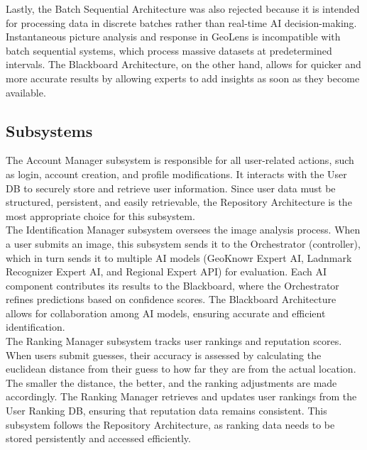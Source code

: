 \documentclass[]{article}
\begin{document}
\noindent Lastly, the Batch Sequential Architecture was also rejected because it is intended for processing data in discrete batches rather than real-time AI decision-making. Instantaneous picture analysis and response in GeoLens is incompatible with batch sequential systems, which process massive datasets at predetermined intervals. The Blackboard Architecture, on the other hand, allows for quicker and more accurate results by allowing experts to add insights as soon as they become available.\\


\subsection{Subsystems}
\label{sub:subsystems}

 \noindent The Account Manager subsystem is responsible for all user-related actions, such as login, account creation, and profile modifications. It interacts with the User DB to securely store and retrieve user information. Since user data must be structured, persistent, and easily retrievable, the Repository Architecture is the most appropriate choice for this subsystem. \\

\noindent The Identification Manager subsystem oversees the image analysis process. When a user submits an image, this subsystem sends it to the Orchestrator (controller), which in turn sends it to multiple AI models (GeoKnowr Expert AI, Ladnmark Recognizer Expert AI, and Regional Expert API) for evaluation. Each AI component contributes its results to the Blackboard, where the Orchestrator refines predictions based on confidence scores. The Blackboard Architecture allows for collaboration among AI models, ensuring accurate and efficient identification. \\

\noindent The Ranking Manager subsystem tracks user rankings and reputation scores. When users submit guesses, their accuracy is assessed by calculating the euclidean distance from their guess to how far they are from the actual location. The smaller the distance, the better, and the ranking adjustments are made accordingly. The Ranking Manager retrieves and updates user rankings from the User Ranking DB, ensuring that reputation data remains consistent. This subsystem follows the Repository Architecture, as ranking data needs to be stored persistently and accessed efficiently.
\end{document}
